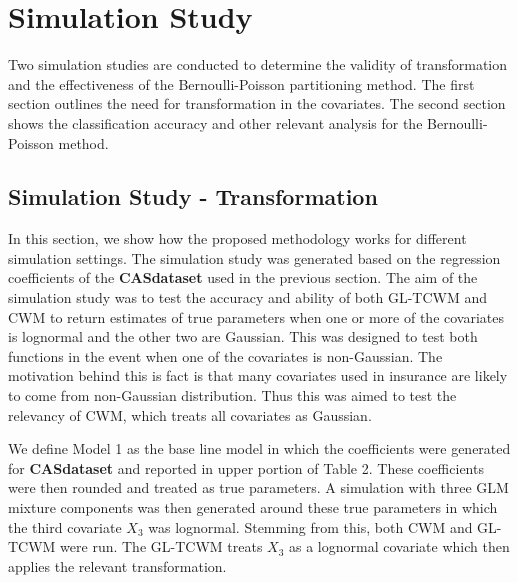 \documentclass[11pt,letterpaper]{article}
\numberwithin{equation}{section}
\numberwithin{equation}{section}
\numberwithin{equation}{section}
\begin{document}

\section{Simulation Study}

Two simulation studies are conducted to determine the validity of transformation and the effectiveness of the Bernoulli-Poisson partitioning method. The first section outlines the need for transformation in the covariates. The second section shows the classification accuracy and other relevant analysis for the Bernoulli-Poisson method.


\subsection{Simulation Study - Transformation}


In this section, we show how the proposed methodology works for different simulation settings. The simulation study was generated based on the regression coefficients of the \textbf{CASdataset} used in the previous section. The aim of the simulation study was to test the accuracy and ability of both GL-TCWM and CWM to return estimates of true parameters when one or more of the covariates is lognormal and the other two are Gaussian. This was designed to test both functions in the event when one of the covariates is non-Gaussian. The motivation behind this is fact is that many covariates used in insurance are likely to come from non-Gaussian distribution. Thus this was aimed to test the relevancy of CWM, which treats all covariates as Gaussian.

We define Model 1 as the base line model in which the coefficients were generated for \textbf{CASdataset} and reported in upper portion of Table 2. These coefficients were then rounded and treated as true parameters. A simulation with three GLM mixture components was then generated around these true parameters in which the third covariate $X_3$ was lognormal. Stemming from this, both CWM and  GL-TCWM were run. The  GL-TCWM treats $X_3$ as a lognormal covariate which then applies the relevant transformation.
\end{document}

